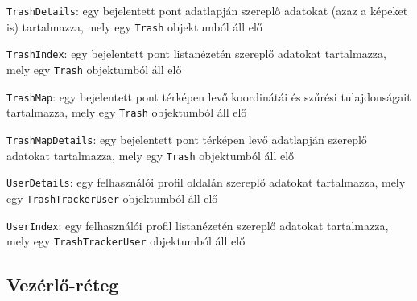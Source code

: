 \begin{compactitem}
	\item \texttt{TrashDetails}: egy bejelentett pont adatlapján szereplő adatokat (azaz a képeket is) tartalmazza, mely egy \texttt{Trash} objektumból áll elő
	\item \texttt{TrashIndex}: egy bejelentett pont listanézetén szereplő adatokat tartalmazza, mely egy \texttt{Trash} objektumból áll elő
	\item \texttt{TrashMap}: egy bejelentett pont térképen levő koordinátái és szűrési tulajdonságait tartalmazza, mely egy \texttt{Trash} objektumból áll elő
	\item \texttt{TrashMapDetails}: egy bejelentett pont térképen levő adatlapján szereplő adatokat tartalmazza, mely egy \texttt{Trash} objektumból áll elő
	\item \texttt{UserDetails}: egy felhasználói profil oldalán szereplő adatokat tartalmazza, mely egy \texttt{TrashTrackerUser} objektumból áll elő
	\item \texttt{UserIndex}: egy felhasználói profil listanézetén szereplő adatokat tartalmazza, mely egy \texttt{TrashTrackerUser} objektumból áll elő
\end{compactitem}

\subsection{Vezérlő-réteg}

